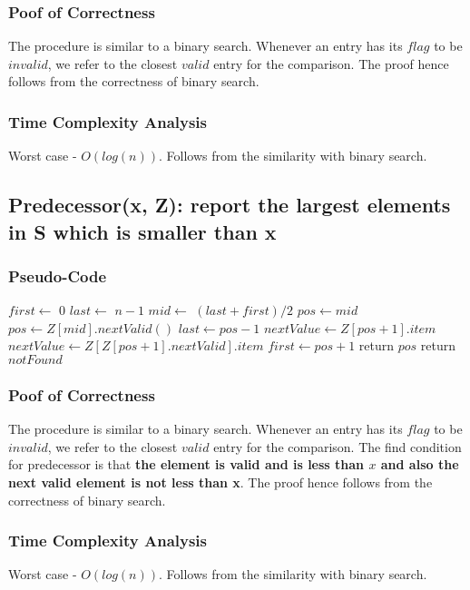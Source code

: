 \documentclass{article}
\begin{document}
\subsubsection{Poof of Correctness}
The procedure is similar to a binary search. Whenever an entry has its $flag$ to be $invalid$, we refer to the closest $valid$ entry for the comparison. The proof hence follows from the correctness of binary search.
\subsubsection{Time Complexity Analysis}
Worst case - $O(log(n))$. Follows from the similarity with binary search.
\subsection{Predecessor(x, Z): report the largest elements in S which is smaller than x}
\subsubsection{Pseudo-Code}
\begin{algorithmic}[1]
  \State $first \gets$ $0$
  \State $last \gets$ $n-1$
  \State $mid \gets$ $(last + first)/2$
  \State $pos \gets mid$
  \Else
  \State $pos \gets Z[mid].nextValid()$  
  \EndIf
  \State $last \gets pos-1  $
  \State $nextValue \gets Z[pos+1].item$
  \Else
  \State $nextValue \gets Z[Z[pos+1].nextValid].item$
  \EndIf
  \State $first \gets pos+1$
  \Else
  \State return $pos$
  \EndIf
  \EndIf
  \EndWhile
  \State return $notFound$
  \EndProcedure
\end{algorithmic} 
\subsubsection{Poof of Correctness}
The procedure is similar to a binary search. Whenever an entry has its $flag$ to be $invalid$, we refer to the closest $valid$ entry for the comparison. The find condition for predecessor is that {\bf the element is valid and is less than $x$ and also the next valid element is not less than x}. The proof hence follows from the correctness of binary search.
\subsubsection{Time Complexity Analysis}
Worst case - $O(log(n))$. Follows from the similarity with binary search.
\end{document}
